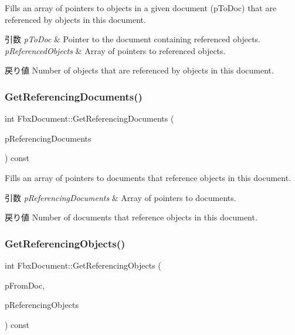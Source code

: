 Fills an array of pointers to objects in a given document (p\+To\+Doc) that are referenced by objects in this document.


\begin{DoxyParams}{引数}
{\em p\+To\+Doc} & Pointer to the document containing referenced objects. \\
\hline
{\em p\+Referenced\+Objects} & Array of pointers to referenced objects. \\
\hline
\end{DoxyParams}
\begin{DoxyReturn}{戻り値}
Number of objects that are referenced by objects in this document. 
\end{DoxyReturn}
\mbox{\label{class_fbx_document_a86633de9f5fae33cae2f0313d8f32759}} 
\subsubsection{\texorpdfstring{Get\+Referencing\+Documents()}{GetReferencingDocuments()}}
{\footnotesize\ttfamily int Fbx\+Document\+::\+Get\+Referencing\+Documents (\begin{DoxyParamCaption}\item[{\hyperlink{class_fbx_array}{Fbx\+Array}$<$ \hyperlink{class_fbx_document}{Fbx\+Document} $\ast$$>$ \&}]{p\+Referencing\+Documents }\end{DoxyParamCaption}) const}

Fills an array of pointers to documents that reference objects in this document.


\begin{DoxyParams}{引数}
{\em p\+Referencing\+Documents} & Array of pointers to documents. \\
\hline
\end{DoxyParams}
\begin{DoxyReturn}{戻り値}
Number of documents that reference objects in this document. 
\end{DoxyReturn}
\mbox{\label{class_fbx_document_a9ca396cbe7d145cfedd2d5028d83e3e7}} 
\subsubsection{\texorpdfstring{Get\+Referencing\+Objects()}{GetReferencingObjects()}}
{\footnotesize\ttfamily int Fbx\+Document\+::\+Get\+Referencing\+Objects (\begin{DoxyParamCaption}\item[{const \hyperlink{class_fbx_document}{Fbx\+Document} $\ast$}]{p\+From\+Doc,  }\item[{\hyperlink{class_fbx_array}{Fbx\+Array}$<$ \hyperlink{class_fbx_object}{Fbx\+Object} $\ast$$>$ \&}]{p\+Referencing\+Objects }\end{DoxyParamCaption}) const}

